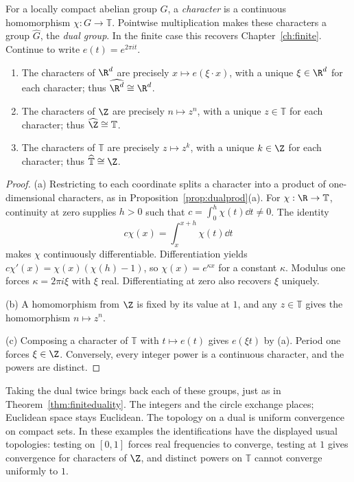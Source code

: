 For a locally compact abelian group $G$, a \emph{character} is a continuous homomorphism $\chi:G\to\mathbb T$. Pointwise multiplication makes these characters a group $\widehat G$, the \emph{dual group}. In the finite case this recovers Chapter~\ref{ch:finite}. Continue to write $e(t)=e^{2\pi it}$.

\begin{theorem}\label{thm:duals}
\begin{enumerate}
\item[(a)] The characters of $\R^d$ are precisely $x\mapsto e(\xi\cdot x)$, with a unique $\xi\in\R^d$ for each character; thus $\widehat{\R^d}\cong\R^d$.
\item[(b)] The characters of $\Z$ are precisely $n\mapsto z^n$, with a unique $z\in\mathbb T$ for each character; thus $\widehat{\Z}\cong\mathbb T$.
\item[(c)] The characters of $\mathbb T$ are precisely $z\mapsto z^k$, with a unique $k\in\Z$ for each character; thus $\widehat{\mathbb T}\cong\Z$.
\end{enumerate}
\end{theorem}
\begin{proof}
(a) Restricting to each coordinate splits a character into a product of one-dimensional characters, as in Proposition~\ref{prop:dualprod}(a). For $\chi:\R\to\mathbb T$, continuity at zero supplies $h>0$ such that $c=\int_0^h\chi(t)\dd t\ne0$. The identity
\[c\chi(x)=\int_x^{x+h}\chi(t)\dd t\]
makes $\chi$ continuously differentiable. Differentiation yields $c\chi'(x)=\chi(x)(\chi(h)-1)$, so $\chi(x)=e^{\kappa x}$ for a constant $\kappa$. Modulus one forces $\kappa=2\pi i\xi$ with $\xi$ real. Differentiating at zero also recovers $\xi$ uniquely.

(b) A homomorphism from $\Z$ is fixed by its value at $1$, and any $z\in\mathbb T$ gives the homomorphism $n\mapsto z^n$.

(c) Composing a character of $\mathbb T$ with $t\mapsto e(t)$ gives $e(\xi t)$ by (a). Period one forces $\xi\in\Z$. Conversely, every integer power is a continuous character, and the powers are distinct.
\end{proof}

Taking the dual twice brings back each of these groups, just as in Theorem~\ref{thm:finiteduality}. The integers and the circle exchange places; Euclidean space stays Euclidean. The topology on a dual is uniform convergence on compact sets. In these examples the identifications have the displayed usual topologies: testing on $[0,1]$ forces real frequencies to converge, testing at $1$ gives convergence for characters of $\Z$, and distinct powers on $\mathbb T$ cannot converge uniformly to $1$.

